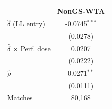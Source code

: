 \begin{tabular}{lc}
\toprule
 & NonGS-WTA \\
\midrule
$\hat{\delta}$ (LL entry) & -0.0745$^{***}$ \\
 & (0.0278) \\
$\hat{\delta}$ $\times$ Perf. dose & 0.0207 \\
 & (0.0222) \\
$\hat{\rho}$ & 0.0271$^{**}$ \\
 & (0.0111) \\
\midrule
Matches & 80,168 \\
\bottomrule
\end{tabular}

